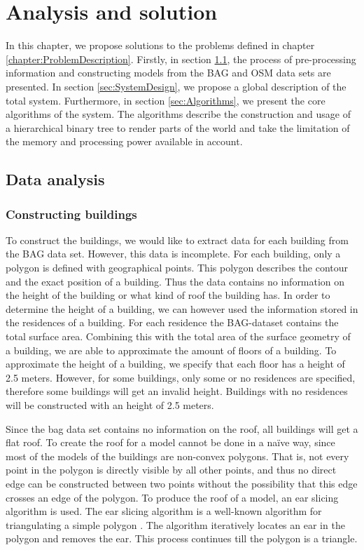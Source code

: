 \chapter{Analysis and solution}
\label{chap:AnalysisAndSolution}
In this chapter, we propose solutions to the problems defined in chapter \ref{chapter:ProblemDescription}. Firstly, in section \ref{sec:DataAnalysis}, the process of pre-processing information and constructing models from the BAG and OSM data sets are presented. In section \ref{sec:SystemDesign}, we propose a global description of the total system. Furthermore, in section \ref{sec:Algorithms}, we present the core algorithms of the system. The algorithms describe the construction and usage of a hierarchical binary tree to render parts of the world and take the limitation of the memory and processing power available in account.

\section{Data analysis}
\label{sec:DataAnalysis}
\subsection{Constructing buildings}
To construct the buildings, we would like to extract data for each building from the BAG data set. However, this data is incomplete. For each building, only a polygon is defined with geographical points. This polygon describes the contour and the exact position of a building. Thus the data contains no information on the height of the building or what kind of roof the building has. In order to determine the height of a building, we can however used the information stored in the residences of a building. For each residence the BAG-dataset contains the total surface area. Combining this with the total area of the surface geometry of a building, we are able to approximate the amount of floors of a building. To approximate the height of a building, we specify that each floor has a height of 2.5 meters. However, for some buildings, only some or no residences are specified, therefore some buildings will get an invalid height. Buildings with no residences will be constructed with an height of 2.5 meters.

Since the bag data set contains no information on the roof, all buildings will get a flat roof. To create the roof for a model cannot be done in a naïve way, since most of the models of the buildings are non-convex polygons. That is, not every point in the polygon is directly visible by all other points, and thus no direct edge can be constructed between two points without the possibility that this edge crosses an edge of the polygon. To produce the roof of a model, an ear slicing algorithm is used. The ear slicing algorithm is a well-known algorithm for triangulating a simple polygon \cite{Kajak11}. The algorithm iteratively locates an ear in the polygon and removes the ear. This process continues till the polygon is a triangle.

